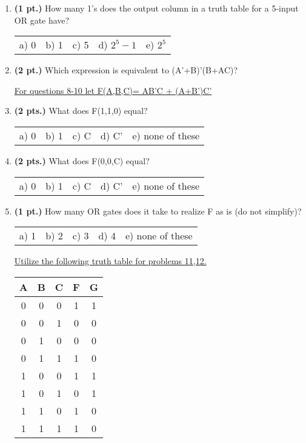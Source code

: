 \documentclass{article}
\begin{document}
\begin{enumerate}
\item {\bf (1 pt.)} How many 1's does the output column in a truth table for a 
5-input OR gate have?

\begin{tabular}{p{0.7in} p{0.7in} p{0.7in} p{0.7in} l}
a) 0 & b) 1 & c) 5 & d) $2^{5}-1$ & e) $2^5$
\end{tabular}

\item {\bf (2 pt.)} Which expression is equivalent to (A'+B)'(B+AC)?

\pagebreak

\underline{For questions 8-10 let F(A,B,C)= AB'C + (A+B')C'}

\item {\bf (2 pts.)} What does F(1,1,0) equal?

\begin{tabular}{p{0.7in} p{0.7in} p{0.7in} p{0.7in} l}
a) 0 & b) 1 & c) C & d) C' & e) none of these
\end{tabular}

\item {\bf (2 pts.)} What does F(0,0,C) equal?

\begin{tabular}{p{0.7in} p{0.7in} p{0.7in} p{0.7in} l}
a) 0 & b) 1 & c) C & d) C' & e) none of these
\end{tabular}

\item {\bf (1 pt.)} How many OR gates does it take to realize F
as is (do not simplify)?

\begin{tabular}{p{0.7in} p{0.7in} p{0.7in} p{0.7in} l}
a) 1 & b) 2 & c) 3 & d) 4 & e) none of these
\end{tabular}

\underline{Utilize the following truth table for problems 11,12.}

\begin{tabular}{c|c|c||c|c}
A & B & C & F & G  \\ \hline \hline
0 & 0 & 0 & 1 & 1  \\ \hline
0 & 0 & 1 & 0 & 0  \\ \hline
0 & 1 & 0 & 0 & 0  \\ \hline
0 & 1 & 1 & 1 & 0  \\ \hline
1 & 0 & 0 & 1 & 1  \\ \hline
1 & 0 & 1 & 0 & 1  \\ \hline
1 & 1 & 0 & 1 & 0  \\ \hline
1 & 1 & 1 & 1 & 0  \\
\end{tabular} 


\end{enumerate}
\end{document}
